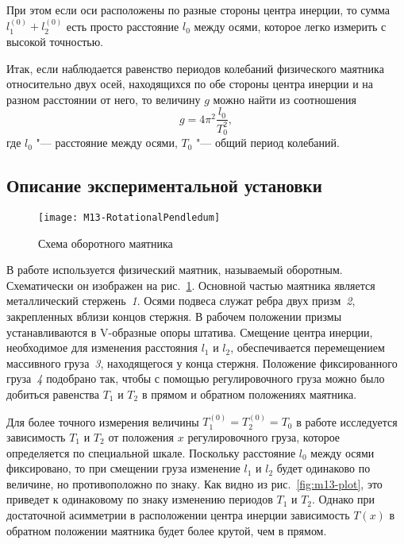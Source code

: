 \documentclass[a4paper, 12pt]{extarticle}
\begin{document}
При этом если оси расположены по разные стороны центра инерции, то сумма $l_1^{(0)} +l_2^{(0)}$ есть просто расстояние $l_0$ между осями, которое легко измерить с высокой точностью.

Итак, если наблюдается равенство периодов колебаний физического маятника относительно двух осей, находящихся по обе стороны центра инерции и на разном расстоянии от него, то величину $g$ можно найти из соотношения 
\begin{equation}
\label{eq:m13-g-3}
g = 4 \pi^2 \frac{l_0}{T_0^2},
\end{equation}
где $l_0$  "--- расстояние между осями, $T_0$ "--- общий период колебаний.

\subsection{Описание экспериментальной установки}

\begin{figure}[h]
\begin{center}
\texttt{[image: M13-RotationalPendledum]}
\end{center}
\caption{Схема оборотного маятника \label{fig:m13-pendulum}}
\end{figure}

В работе используется физический маятник, называемый оборотным. Схематически он изображен на рис.~\ref{fig:m13-pendulum}. Основной частью маятника является металлический стержень~\emph{1}. Осями подвеса служат ребра двух призм~\emph{2}, закрепленных вблизи концов стержня. В рабочем положении призмы устанавливаются в V-образные опоры штатива. %
Смещение центра инерции, необходимое для изменения расстояния $l_1$ и $l_2$,  обеспечивается перемещением массивного груза~\emph{3}, находящегося у конца стержня. Положение фиксированного груза~\emph{4} подобрано так, чтобы с помощью регулировочного груза можно было добиться равенства $T_1$ и $T_2$ в прямом и обратном положениях маятника.

Для более точного измерения величины $T_1^{(0)} = T_2^{(0)} = T_0$ в работе исследуется зависимость $T_1$ и $T_2$ от положения $x$ регулировочного груза, которое определяется по специальной шкале. Поскольку расстояние $l_0$ между осями фиксировано, то при смещении груза изменение $l_1$ и $l_2$ будет одинаково по величине, но противоположно по знаку. Как видно из рис.~\ref{fig:m13-plot}, это приведет к одинаковому по знаку изменению периодов $T_1$ и $T_2$. Однако при достаточной асимметрии в расположении центра инерции зависимость $T(x)$ в обратном положении маятника будет более крутой, чем в прямом. %
\end{document}

